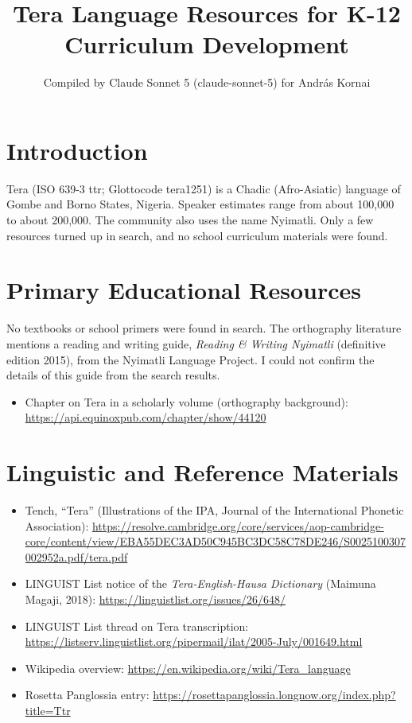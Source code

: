 \documentclass[12pt]{article}
\title{Tera Language Resources for K-12 Curriculum Development}
\author{Compiled by Claude Sonnet 5 (claude-sonnet-5) for Andr\'as Kornai}
\date{}
\begin{document}
\maketitle
\section{Introduction}
Tera (ISO 639-3 ttr; Glottocode tera1251) is a Chadic (Afro-Asiatic) language of Gombe and Borno States, Nigeria. Speaker estimates range from about 100,000 to about 200,000. The community also uses the name Nyimatli. Only a few resources turned up in search, and no school curriculum materials were found.
\section{Primary Educational Resources}
No textbooks or school primers were found in search. The orthography literature mentions a reading and writing guide, \emph{Reading \& Writing Nyimatli} (definitive edition 2015), from the Nyimatli Language Project. I could not confirm the details of this guide from the search results.
\begin{itemize}
\item Chapter on Tera in a scholarly volume (orthography background): \url{https://api.equinoxpub.com/chapter/show/44120}
\end{itemize}
\section{Linguistic and Reference Materials}
\begin{itemize}
\item Tench, ``Tera'' (Illustrations of the IPA, Journal of the International Phonetic Association): \url{https://resolve.cambridge.org/core/services/aop-cambridge-core/content/view/EBA55DEC3AD50C945BC3DC58C78DE246/S0025100307002952a.pdf/tera.pdf}
\item LINGUIST List notice of the \emph{Tera-English-Hausa Dictionary} (Maimuna Magaji, 2018): \url{https://linguistlist.org/issues/26/648/}
\item LINGUIST List thread on Tera transcription: \url{https://listserv.linguistlist.org/pipermail/ilat/2005-July/001649.html}
\item Wikipedia overview: \url{https://en.wikipedia.org/wiki/Tera_language}
\item Rosetta Panglossia entry: \url{https://rosettapanglossia.longnow.org/index.php?title=Ttr}
\end{itemize}
\end{document}
